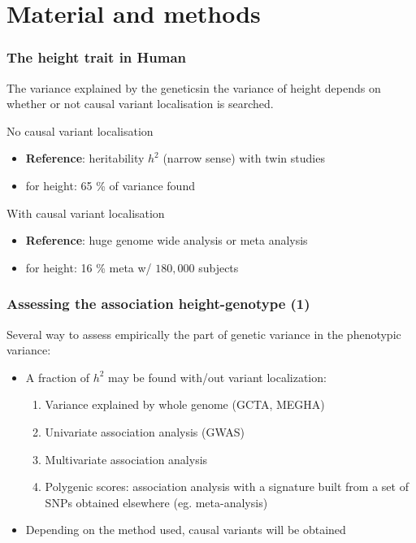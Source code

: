 \documentclass[utf8]{beamer}
\begin{document}
\section{Material and methods}
\begin{frame}
\frametitle{The height trait in Human}


The variance explained by the geneticsin the variance of height depends on whether or not  causal
variant localisation is searched.
	\begin{block}{No causal variant localisation}
	\begin{itemize}
	\item \textbf{Reference}: heritability $h^2$ (narrow sense)  with twin studies
	\item for height: 65 \% of variance found \cite{}
	\end{itemize}
	\end{block}
	
	\begin{block}{With causal variant localisation}
	\begin{itemize}
	\item \textbf{Reference}: huge genome wide analysis or meta analysis
	\item for height: 16 \% meta w/ $180,000$ subjects \cite{LangoAllen2010}
	\end{itemize}
	\end{block}

\end{frame}

\begin{frame}
\frametitle{Assessing the association height-genotype (1)}
Several way to assess empirically the part of genetic variance in the 
phenotypic variance:
\begin{itemize}
\item A fraction of $h^2$ may be found with/out variant localization:
	\vspace{.5cm}
	\begin{enumerate}
	\item Variance explained by whole genome (GCTA, MEGHA)
	\item Univariate association analysis (GWAS)
	\item Multivariate association analysis
	\item Polygenic scores: association analysis with a signature built 
	from a set of SNPs obtained elsewhere (eg. meta-analysis)
	\end{enumerate}
	
\vspace{.5cm}
\item Depending on the method used, causal variants will be obtained
\end{itemize}
\end{frame}
\end{document}
